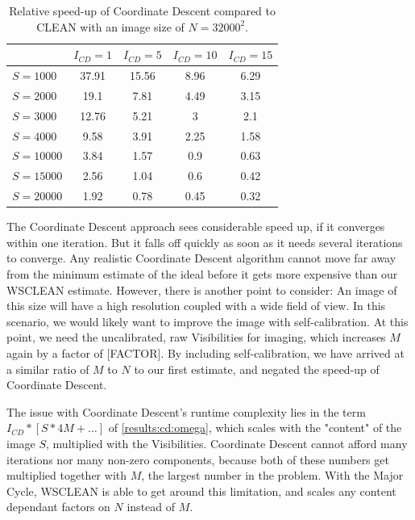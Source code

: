 \begin{table}[h!]
	\begin{center}
		\begin{tabular}{l|c|c|c|c} %
			& $I_{CD} = 1$ & $I_{CD} = 5$ &  $I_{CD} = 10$ &  $I_{CD} = 15$\\
			\hline
			$S=1000$ & 37.91 & 15.56 & 8.96 & 6.29 \\
			$S=2000$ & 19.1 & 7.81 & 4.49 & 3.15  \\
			$S=3000$ & 12.76 & 5.21 & 3 & 2.1  \\
			$S=4000$ & 9.58 & 3.91 & 2.25 & 1.58 \\
			\hline
			$S=10000$ & 3.84 & 1.57 & 0.9 & 0.63  \\
			$S=15000$ & 2.56 & 1.04 & 0.6 & 0.42\\
			$S=20000$ & 1.92 & 0.78 & 0.45 & 0.32 \\
		\end{tabular}
		\caption{Relative speed-up of Coordinate Descent compared to CLEAN with an image size of $N=32000^2$. }
		\label{res:cd:large:table}
	\end{center}
\end{table}

The Coordinate Descent approach sees considerable speed up, if it converges within one iteration. But it falls off quickly as soon as it needs several iterations to converge. Any realistic Coordinate Descent algorithm cannot move far away from the minimum estimate of the ideal before it gets more expensive than our WSCLEAN estimate. However, there is another point to consider: An image of this size will have a high resolution coupled with a wide field of view. In this scenario, we would likely want to improve the image with self-calibration. At this point, we need the uncalibrated, raw Visibilities for imaging, which increases $M$ again by a factor of [FACTOR]. By including self-calibration, we have arrived at a similar ratio of $M$ to $N$ to our first estimate, and negated the speed-up of Coordinate Descent.  

The issue with Coordinate Descent's runtime complexity lies in the term $I_{CD} * [S * 4M +\ldots]$ of \eqref{results:cd:omega}, which scales with the "content" of the image $S$, multiplied with the Visibilities. Coordinate Descent cannot afford many iterations nor many non-zero components, because both of these numbers get multiplied together with $M$, the largest number in the problem. With the Major Cycle, WSCLEAN is able to get around this limitation, and scales any content dependant factors on $N$ instead of $M$. 

